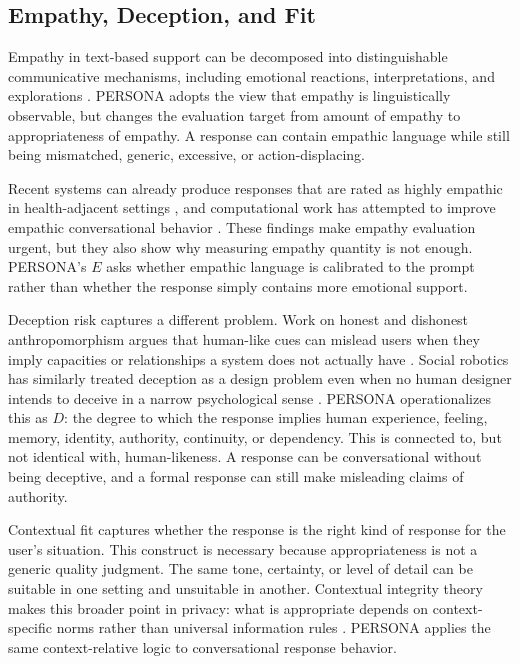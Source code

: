 \documentclass[manuscript,review,anonymous]{acmart}
\begin{document}
\subsection{Empathy, Deception, and Fit}
Empathy in text-based support can be decomposed into distinguishable communicative mechanisms, including emotional reactions, interpretations, and explorations \cite{Sharma2020Empathy}. PERSONA adopts the view that empathy is linguistically observable, but changes the evaluation target from amount of empathy to appropriateness of empathy. A response can contain empathic language while still being mismatched, generic, excessive, or action-displacing.

Recent systems can already produce responses that are rated as highly empathic in health-adjacent settings \cite{Ayers2023PhysicianChatbot}, and computational work has attempted to improve empathic conversational behavior \cite{Sharma2021EmpathyRL}. These findings make empathy evaluation urgent, but they also show why measuring empathy quantity is not enough. PERSONA's $E$ asks whether empathic language is calibrated to the prompt rather than whether the response simply contains more emotional support.

Deception risk captures a different problem. Work on honest and dishonest anthropomorphism argues that human-like cues can mislead users when they imply capacities or relationships a system does not actually have \cite{Kaminski2017RobotEyes,Leong2019Dishonest}. Social robotics has similarly treated deception as a design problem even when no human designer intends to deceive in a narrow psychological sense \cite{Sharkey2021Deception}. PERSONA operationalizes this as $D$: the degree to which the response implies human experience, feeling, memory, identity, authority, continuity, or dependency. This is connected to, but not identical with, human-likeness. A response can be conversational without being deceptive, and a formal response can still make misleading claims of authority.

Contextual fit captures whether the response is the right kind of response for the user's situation. This construct is necessary because appropriateness is not a generic quality judgment. The same tone, certainty, or level of detail can be suitable in one setting and unsuitable in another. Contextual integrity theory makes this broader point in privacy: what is appropriate depends on context-specific norms rather than universal information rules \cite{Nissenbaum2004ContextualIntegrity}. PERSONA applies the same context-relative logic to conversational response behavior.
\end{document}

